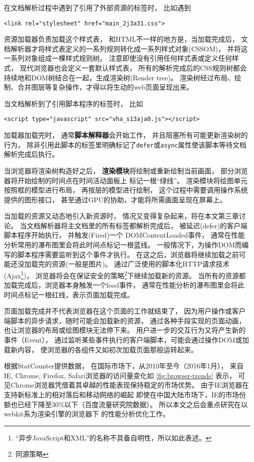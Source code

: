 在文档解析过程中遇到了引用了外部资源的标签时，
比如遇到
\begin{lstlisting}
<link rel="stylesheet" href="main_2j3a31.css">
\end{lstlisting}
资源加载器负责加载这个样式表，
和HTML不一样的地方是，当加载完成后，
文档解析器才将样式表定义的一系列规则转化成一系列样式对象(CSSOM)，
并将这一系列对象组成一棵样式规则树。
注意即使没有引用任何样式表或定义任何样式，
现代浏览器也会定义一套默认样式表，
所有的解析完成后的CSS规则树都会持续地和DOM树结合在一起，生成渲染树(Render tree)。
渲染树经过布局、绘制、合并图层等复杂操作，才得以将生动的web页面呈现出来。

当文档解析到了引用脚本程序的标签时，
比如
\begin{lstlisting}
<script type="javascript" src="vha_s13aja0.js"></script>
\end{lstlisting}
加载器加载完时，
通常\textbf{脚本解释器}会开始工作，
并且阻塞所有可能更新渲染树的行为，
除非引用此脚本的标签里明确标记了\texttt{defer}或\texttt{async}属性使该脚本等待文档解析完成后执行。

当浏览器将渲染树构造好之后，
\textbf{渲染模块}将绘制或重新绘制当前画面，
部分浏览器将开始绘制的时间点在时间活动面板上
标记一根``绿线''。
渲染模块将绘图单元按照框的模型进行布局，
再按层的模型进行绘制，
这个过程中需要调用操作系统提供的图形接口，
甚至通过GPU的协助，才能将所需画面呈现在屏幕上。

当加载的资源又动态地引入新资源时，
情况又变得复杂起来，将在本文第三章讨论。
当文档解析器将主文档里的所有标签都解析完成后，
被延迟(defer)的客户端脚本程序开始执行，
并触发(Fired)一个 DOMContentLoaded事件，
通常在性能分析常用的瀑布图里会将此时间点标记一根蓝线。
一般情况下，为操作DOM而编写的脚本程序需要监听到这个事件才执行。
在这之后，浏览器将继续加载之前可能还没加载完的资源(一般是图片)。
通过广泛使用的脚本化HTTP请求技术(Ajax\footnote{``异步JavaScript和XML''的名称不具备自明性，所以如此表述。})，
浏览器将会在保证安全的策略\footnote{同源策略}下继续加载新的资源。
当所有的资源都加载完成后，浏览器本身触发一个load事件，
通常在性能分析的瀑布图里会将此时间点标记一根红线，表示页面加载完成。

页面加载完成并不代表浏览器在这个页面的工作就结束了，
因为用户操作或客户端脚本的异步请求，随时可能会加载新的资源，
通过各种手段实现的页面动画，也让浏览器的布局或绘图模块无法停下来。
用户进一步的交互行为又将产生新的事件（Event），
通过监听某些事件执行的客户端脚本，可能会通过操作DOM或加载新内容，
使浏览器的各组件又如初次加载页面那般运转起来。

根据StatCounter提供数据，
在国际市场下，从2010年至今（2016年1月），
来自IE, Chrome, Firefox, Safari浏览器的访问量变化如
\autoref{fig:browser-trends} 表示，
可见Chrome浏览器凭借着其卓越的性能表现保持稳定的市场优势。
由于IE浏览器在支持新标准上的相对落后和移动网络的崛起
即使在中国大陆市场下，IE的市场份额也已经下降至30\%以下（百度流量研究院数据）。
所以本文之后会重点研究在以webkit系为渲染引擎的浏览器下
的性能分析优化工作。

